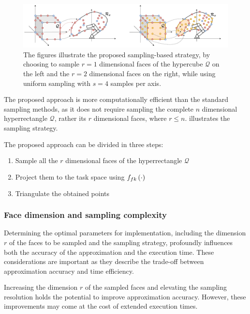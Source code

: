 \begin{figure}[!h]
    \centering
    \includegraphics[width=\textwidth]{Papers/images/curved_space_algo_new_faces.pdf}
    \caption{The figures illustrate the proposed sampling-based strategy, by choosing to sample $r=1$ dimensional faces of the hypercube $\mathcal{Q}$ on the left and the $r=2$ dimensional faces on the right, while using uniform sampling with $s=4$ samples per axis.}
    \label{fig:curved_space_algo_new_faces}
\end{figure}

The proposed approach is more computationally efficient than the standard sampling methods, as it does not require sampling the complete $n$ dimensional hyperrectangle $\mathcal{Q}$, rather its $r$ dimensional faces, where $r\leq n$.  illustrates the sampling strategy. 

The proposed approach can be divided in three steps:
\begin{enumerate}
    \item Sample all the $r$ dimensional faces of the hyperrectangle $\mathcal{Q}$
    \item Project them to the task space using $f_{fk}\left(\cdot\right)$
    \item Triangulate the obtained points
\end{enumerate}

\subsubsection*{Face dimension and sampling complexity} Determining the optimal parameters for implementation, including the dimension $r$ of the faces to be sampled and the sampling strategy, profoundly influences both the accuracy of the approximation and the execution time. These considerations are important as they describe the trade-off between approximation accuracy and time efficiency.

Increasing the dimension $r$ of the sampled faces and elevating the sampling resolution holds the potential to improve approximation accuracy. However, these improvements may come at the cost of extended execution times.


